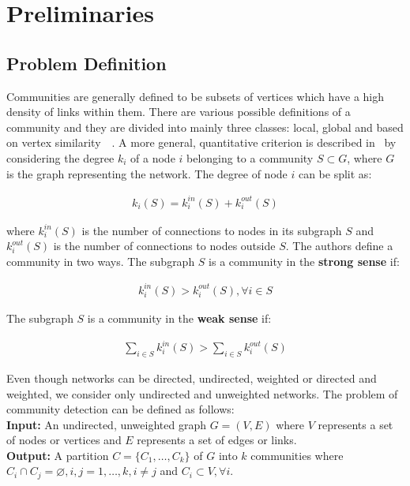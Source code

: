 \chapter{Preliminaries}
\begin{spacing}{1.5}
\thispagestyle{empty}
\section{Problem Definition}
Communities are generally defined to be subsets of vertices which have a high density of links within them. There are various possible definitions of a community and they are divided into mainly three classes: local, global and based on vertex similarity~\cite{Fortunato201075}~\cite{Wasserman-Social-1994}. A more general, quantitative criterion is described in~\cite{Radicchi02032004} by considering the degree $k_i$ of a node $i$ belonging to a community $S \subset G$, where $G$ is the graph representing the network. The degree of node $i$ can be split as:

\begin{align}
k_i(S) = k_i^{in}(S) + k_i^{out}(S)
\end{align}

where $k_i^{in}(S)$ is the number of connections to nodes in its subgraph $S$ and $k_i^{out}(S)$ is the number of connections to nodes outside $S$. The authors define a community in two ways. The subgraph $S$ is a community in the \textbf{strong sense} if:

\begin{align}
k_i^{in}(S) > k_i^{out}(S), \forall i \in S
\end{align}

\newpage
The subgraph $S$ is a community in the \textbf{weak sense} if:

\begin{align}
\displaystyle\sum_{i \in S} k_i^{in}(S) > \displaystyle\sum_{i \in S} k_i^{out}(S)
\end{align}

Even though networks can be directed, undirected, weighted or directed and weighted, we consider only undirected and unweighted networks. The problem of community detection can be defined as follows:\\

\noindent \textbf{Input: }An undirected, unweighted graph $G = (V, E)$ where $V$ represents a set of nodes or vertices and $E$ represents a set of edges or links. \\
\noindent \textbf{Output: }A partition $C = \{C_1, \ldots, C_k\}$ of $G$ into $k$ communities where $C_i \cap C_j = \varnothing, i, j = {1, \ldots, k}, i \neq j$ and $C_i \subset V,  \forall i$. \\


\end{spacing}
